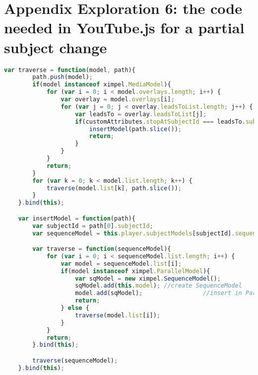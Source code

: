 \chapter{Appendix Exploration 6: the code needed in YouTube.js for a partial subject change}
\label{chap:exploration6_appendix}

\begin{lstlisting}[language=JavaScript]
	var traverse = function(model, path){
		path.push(model);
		if(model instanceof ximpel.MediaModel){
			for (var i = 0; i < model.overlays.length; i++) {
				var overlay = model.overlays[i];
				for (var j = 0; j < overlay.leadsToList.length; j++) {
					var leadsTo = overlay.leadsToList[j];
					if(customAttributes.stopAtSubjectId === leadsTo.subject){
						insertModel(path.slice());
						return;
					}
				}
			}
			return;
		}
		for (var k = 0; k < model.list.length; k++) {
			traverse(model.list[k], path.slice());
		}
	}.bind(this);

	var insertModel = function(path){
		var subjectId = path[0].subjectId;
		var sequenceModel = this.player.subjectModels[subjectId].sequenceModel;

		var traverse = function(sequenceModel){
			for (var i = 0; i < sequenceModel.list.length; i++) {
				var model = sequenceModel.list[i];
				if(model instanceof ximpel.ParallelModel){
					var sqModel = new ximpel.SequenceModel();
					sqModel.add(this.model); //create SequenceModel
					model.add(sqModel);					//insert in Parallel Model
					return;
				} else {
					traverse(model.list[i]);
				}
			}
			return;
		}.bind(this);

		traverse(sequenceModel);
	}.bind(this);
\end{lstlisting}